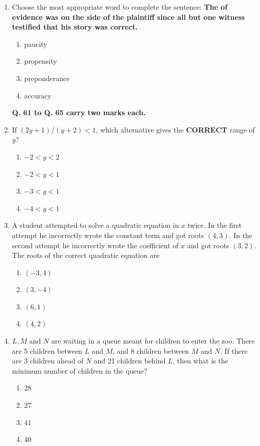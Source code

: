 \documentclass{article}
\begin{document}
\begin{enumerate}
\item Choose the most appropriate word to complete the sentence: \textbf{The \underline{\hspace{2cm}} of evidence was on the side of the plaintiff since all but one witness testified that his story was correct.}
\begin{enumerate}
\item paucity
\item propensity
\item preponderance
\item accuracy
\end{enumerate}

\textbf{Q. 61 to Q. 65 carry two marks each.}\\

\item If $(2y+1)/(y+2) < 1$, which alternative gives the \textbf{CORRECT} range of $y$?
\begin{multicols}{4}
\begin{enumerate}
\item $-2<y<2$
\item $-2<y<1$
\item $-3<y<1$
\item $-4<y<1$
\end{enumerate}
\end{multicols}

\item A student attempted to solve a quadratic equation in $x$ twice. In the first attempt he incorrectly wrote the constant term and got roots $(4,3)$. In the second attempt he incorrectly wrote the coefficient of $x$ and got roots $(3,2)$. The roots of the correct quadratic equation are
\begin{multicols}{4}
\begin{enumerate}
\item $(-3,4)$
\item $(3,-4)$
\item $(6,1)$
\item $(4,2)$
\end{enumerate}
\end{multicols}

\item $L, M$ and $N$ are waiting in a queue meant for children to enter the zoo. There are 5 children between $L$ and $M$, and 8 children between $M$ and $N$. If there are 3 children ahead of $N$ and 21 children behind $L$, then what is the minimum number of children in the queue?
\begin{multicols}{4}
\begin{enumerate}
\item $28$
\item $27$
\item $41$
\item $40$
\end{enumerate}
\end{multicols}


\end{enumerate}
\end{document}
